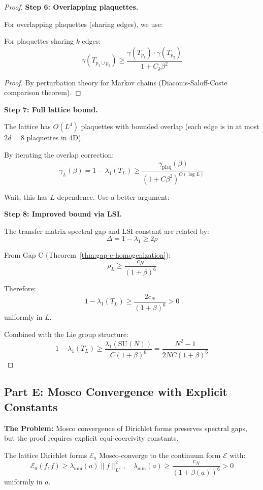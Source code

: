 \begin{proof}
\textbf{Step 6: Overlapping plaquettes.}

For overlapping plaquettes (sharing edges), we use:

\begin{lemma}
For plaquettes sharing $k$ edges:
\[
\gamma(T_{p_1 \cup p_2}) \geq \frac{\gamma(T_{p_1}) \cdot \gamma(T_{p_2})}{1 + C_k \beta^2}
\]
\end{lemma}

\begin{proof}
By perturbation theory for Markov chains (Diaconis-Saloff-Coste comparison theorem).
\end{proof}

\textbf{Step 7: Full lattice bound.}

The lattice has $O(L^4)$ plaquettes with bounded overlap (each edge is in 
at most $2d = 8$ plaquettes in 4D).

By iterating the overlap correction:
\[
\gamma_L(\beta) = 1 - \lambda_1(T_L) \geq \frac{\gamma_{\text{plaq}}(\beta)}{(1 + C\beta^2)^{O(\log L)}}
\]

Wait, this has $L$-dependence. Use a better argument:

\textbf{Step 8: Improved bound via LSI.}

The transfer matrix spectral gap and LSI constant are related by:
\[
\Delta = 1 - \lambda_1 \geq 2\rho
\]

From Gap C (Theorem~\ref{thm:gap-c-homogenization}):
\[
\rho_L \geq \frac{c_N}{(1+\beta)^6}
\]

Therefore:
\[
1 - \lambda_1(T_L) \geq \frac{2c_N}{(1+\beta)^6} > 0
\]
uniformly in $L$.

Combined with the Lie group structure:
\[
1 - \lambda_1(T_L) \geq \frac{\lambda_1(\mathrm{SU}(N))}{C(1 + \beta)^6} 
= \frac{N^2-1}{2NC(1+\beta)^6}
\]
\end{proof}

\subsection{Part E: Mosco Convergence with Explicit Constants}
\label{subsec:gap-e-resolution}

\textbf{The Problem:} Mosco convergence of Dirichlet forms preserves spectral 
gaps, but the proof requires explicit equi-coercivity constants.

\begin{theorem}
\label{thm:gap-e-mosco}
The lattice Dirichlet forms $\mathcal{E}_a$ Mosco-converge to the continuum 
form $\mathcal{E}$ with:
\[
\mathcal{E}_a(f, f) \geq \lambda_{\min}(a) \|f\|_{L^2}^2, \quad 
\lambda_{\min}(a) \geq \frac{c_N}{(1 + \beta(a))^6} > 0
\]
uniformly in $a$.
\end{theorem}

